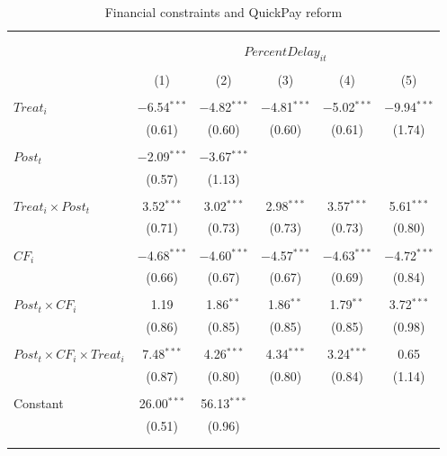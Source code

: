 \documentclass[
]{article}
\begin{document}
\begin{table}[H] \centering 
  \caption{Financial constraints and QuickPay reform} 
  \label{} 
\small 
\begin{tabular}{@{\extracolsep{-2pt}}lccccc} 
\\[-1.8ex]\hline 
\hline \\[-1.8ex] 
\\[-1.8ex] & \multicolumn{5}{c}{$PercentDelay_{it}$  } \\ 
\\[-1.8ex] & (1) & (2) & (3) & (4) & (5)\\ 
\hline \\[-1.8ex] 
 $Treat_i$ & $-$6.54$^{***}$ & $-$4.82$^{***}$ & $-$4.81$^{***}$ & $-$5.02$^{***}$ & $-$9.94$^{***}$ \\ 
  & (0.61) & (0.60) & (0.60) & (0.61) & (1.74) \\ 
  & & & & & \\ 
 $Post_t$ & $-$2.09$^{***}$ & $-$3.67$^{***}$ &  &  &  \\ 
  & (0.57) & (1.13) &  &  &  \\ 
  & & & & & \\ 
 $Treat_i \times Post_t$ & 3.52$^{***}$ & 3.02$^{***}$ & 2.98$^{***}$ & 3.57$^{***}$ & 5.61$^{***}$ \\ 
  & (0.71) & (0.73) & (0.73) & (0.73) & (0.80) \\ 
  & & & & & \\ 
 $CF_i$ & $-$4.68$^{***}$ & $-$4.60$^{***}$ & $-$4.57$^{***}$ & $-$4.63$^{***}$ & $-$4.72$^{***}$ \\ 
  & (0.66) & (0.67) & (0.67) & (0.69) & (0.84) \\ 
  & & & & & \\ 
 $Post_t \times CF_i$ & 1.19 & 1.86$^{**}$ & 1.86$^{**}$ & 1.79$^{**}$ & 3.72$^{***}$ \\ 
  & (0.86) & (0.85) & (0.85) & (0.85) & (0.98) \\ 
  & & & & & \\ 
 $Post_t \times CF_i \times Treat_i$ & 7.48$^{***}$ & 4.26$^{***}$ & 4.34$^{***}$ & 3.24$^{***}$ & 0.65 \\ 
  & (0.87) & (0.80) & (0.80) & (0.84) & (1.14) \\ 
  & & & & & \\ 
 Constant & 26.00$^{***}$ & 56.13$^{***}$ &  &  &  \\ 
  & (0.51) & (0.96) &  &  &  \\ 
  & & & & & \\ 
\hline \\[-1.8ex] 

\end{tabular}
\end{table}
\end{document}
